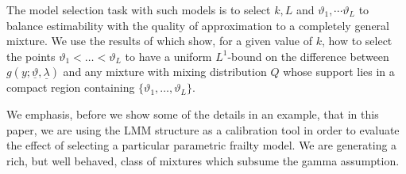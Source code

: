 \documentclass[graybox]{svmult}
\begin{document}
 The model selection task with such models is to select $k, L$ and $\vartheta_1,\cdots\vartheta_L$ to balance estimability with the quality
 of approximation to a completely general mixture.  We use the results of \cite[Section 2.1]{Maroufy2016a} which show, for a given value of $k$, how to select the points $\vartheta_1 < \dots < \vartheta_L$  to have a uniform  $L^1$-bound on   the difference between $g(y;\underline{\vartheta},\underline{\lambda})$ and any mixture with mixing distribution $Q$ whose support lies in a compact region containing  $\{\vartheta_1, \dots,  \vartheta_L\}$.
 
 We emphasis,  before we show some of the details in an example, that in this paper, we are using the LMM structure as a calibration tool in order to evaluate the effect of selecting a particular parametric frailty model. We are generating a rich, but well behaved, class of mixtures which subsume the gamma assumption. 
\end{document}

